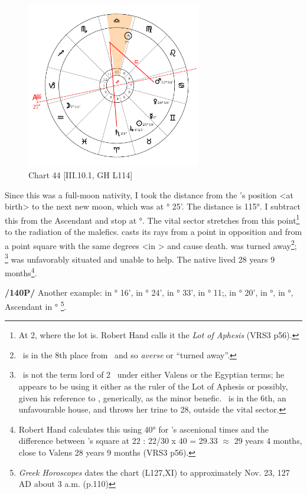 \clearpage
\begin{figure}
\centering
\vspace{-20pt}
\includegraphics[width=0.68\textwidth]{charts/3_10_1}
\caption{Chart 44 [III.10.1, GH L114]}
\label{fig:chart44}
\end{figure} 

Since this was a full-moon nativity, I took the distance from the \Moon’s position <at birth> to the next new moon, which was at \Gemini\xspace 2° 25'. The distance is 115°. I subtract this from the Ascendant and stop at \Libra\xspace 2°. The vital sector stretches from this point\footnote{At 2\Libra, where the lot is. Robert Hand calls it the \textsl{Lot of Aphesis} (VRS3 p56).} to the radiation of the malefics. \Saturn\xspace casts its rays from a point in opposition and \Mars\xspace from a point square with the same degrees <in \Libra> and cause death. \Jupiter\xspace was turned away\footnote{\Jupiter\, is in the 8th place from \Libra\, and so \textsl{averse} or ``turned away''.}; \Venus\,\footnote{\Venus\, is not the term lord of 2 \Libra\, under either Valens or the Egyptian terms; he appears to be using it either as the ruler of the Lot of Aphesis or possibly, given his reference to \Jupiter, generically, as the minor benefic. \Venus\, is in the 6th, an unfavourable house, and throws her trine to 28\Libra, outside the vital sector.} was unfavorably situated and unable to help. The native lived 28 years 9 months\footnote{Robert Hand calculates this using 40° for \Libra's ascenional times and the difference between \Mars's square at 22 \Libra: 22/30 x 40 = 29.33 $\approx$ 29 years 4 months, close to Valens 28 years 9 months (VRS3 p56). }.

\newpage
\textbf{/140P/} Another example: \Sun\xspace in \Sagittarius\xspace 12° 16', \Moon\xspace in \Sagittarius\xspace 17° 24', \Saturn\xspace in \Libra\xspace 11° 33', \Jupiter\xspace in \Gemini\xspace 19° 11;, \Mars\xspace in \Scorpio\xspace 4° 20', \Venus\xspace in \Libra\xspace 26°, \Mercury\xspace in \Scorpio\xspace 27°,
Ascendant in \Libra\xspace 20°
\footnote{\textit{Greek Horoscopes} dates the chart (L127,XI) to approximately Nov. 23, 127 AD about 3 a.m. (p.110)}.

